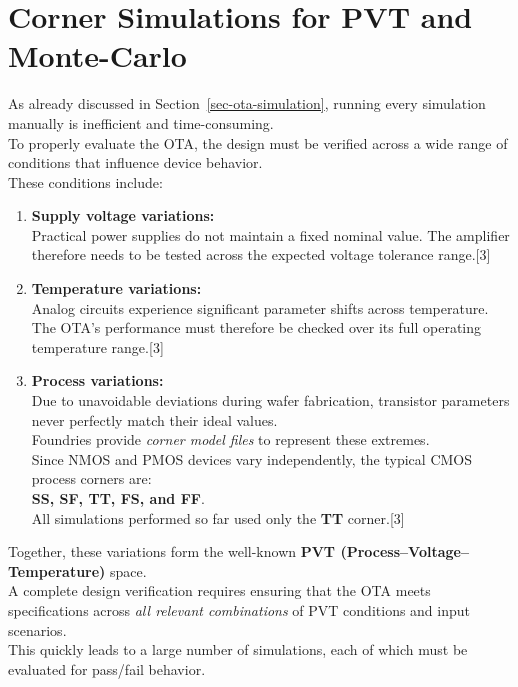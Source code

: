 \documentclass[
  11pt,
  a4paper,
  oneside]{scrbook}
\begin{document}
\chapter{Corner Simulations for PVT and
Monte-Carlo}\label{corner-simulations-for-pvt-and-monte-carlo}

As already discussed in Section~\ref{sec-ota-simulation}, running every
simulation manually is inefficient and time-consuming.\\
To properly evaluate the OTA, the design must be verified across a wide
range of conditions that influence device behavior.\\
These conditions include:

\begin{enumerate}
\def\labelenumi{\arabic{enumi}.}
\item
  \textbf{Supply voltage variations:}\\
  Practical power supplies do not maintain a fixed nominal value. The
  amplifier therefore needs to be tested across the expected voltage
  tolerance range.{[}3{]}
\item
  \textbf{Temperature variations:}\\
  Analog circuits experience significant parameter shifts across
  temperature. The OTA's performance must therefore be checked over its
  full operating temperature range.{[}3{]}
\item
  \textbf{Process variations:}\\
  Due to unavoidable deviations during wafer fabrication, transistor
  parameters never perfectly match their ideal values.\\
  Foundries provide \emph{corner model files} to represent these
  extremes.\\
  Since NMOS and PMOS devices vary independently, the typical CMOS
  process corners are:\\
  \textbf{SS, SF, TT, FS, and FF}.\\
  All simulations performed so far used only the \textbf{TT}
  corner.{[}3{]}
\end{enumerate}

Together, these variations form the well-known \textbf{PVT
(Process--Voltage--Temperature)} space.\\
A complete design verification requires ensuring that the OTA meets
specifications across \emph{all relevant combinations} of PVT conditions
and input scenarios.\\
This quickly leads to a large number of simulations, each of which must
be evaluated for pass/fail behavior.
\end{document}
